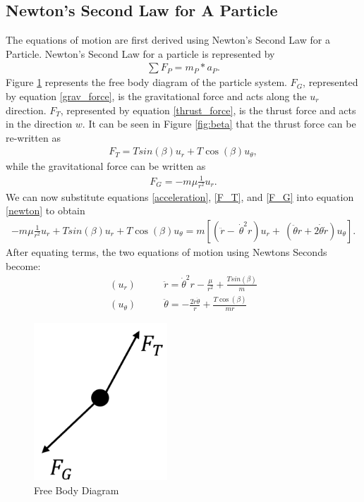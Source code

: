 \documentclass[]{article}
\begin{document}
	\subsection{Newton's Second Law for A Particle}
	The equations of motion are first derived using Newton's Second Law for a Particle. Newton's Second Law for a particle is represented by
	\begin{align}
		\sum{F_{P}} = m_{P} * a_{P}. \label{newton}
	\end{align}
	\vspace{2mm}\newline
	Figure \ref{fig:FBD} represents the free body diagram of the particle system. \(F_{G}\), represented by equation \ref{grav_force}, is the gravitational force and acts along the \(u_{r}\) direction. \(F_{T}\), represented by equation \ref{thrust_force}, is the thrust force and acts in the direction \(w\). It can be seen in Figure \ref{fig:beta} that the thrust force can be re-written as 
	\begin{align}
		F_{T} = Tsin(\beta)u_{r} + T\cos(\beta)u_{\theta}, \label{F_T}
	\end{align}
	while the gravitational force can be written as
	\begin{align}
		F_{G} = -m\mu\frac{1}{r^2}u_{r}. \label{F_G}
	\end{align}
	We can now substitute equations \ref{acceleration},  \ref{F_T}, and \ref{F_G} into equation \ref{newton} to obtain
	\begin{align*}
		-m\mu\frac{1}{r^2}u_{r} + Tsin(\beta)u_{r} + T\cos(\beta)u_{\theta} = m[(\ddot{r} -\ \dot{\theta}^2r)u_{r} +\ (\ddot{\theta}r+2\dot{\theta}\dot{r})u_{\theta}]. 
	\end{align*}
	After equating terms, the two equations of motion using Newtons Seconds become:
	\begin{align}
		(u_{r})\qquad      &  \ddot{r}      = \dot{\theta}^2r - \frac{\mu}{r^2} + \frac{Tsin(\beta)}{m} \label{eom1}\\
		(u_{\theta})\qquad &  \ddot{\theta} = -\frac{2\dot{r}\dot{\theta}}{r}   + \frac{T\cos(\beta)}{mr} \label{eom2}
	\end{align}
	\begin{figure}
		\centering
		\includegraphics[width=50mm,scale=0.5]{FBD.png}
		\caption{Free Body Diagram}
		\label{fig:FBD}
	\end{figure}
\end{document}
